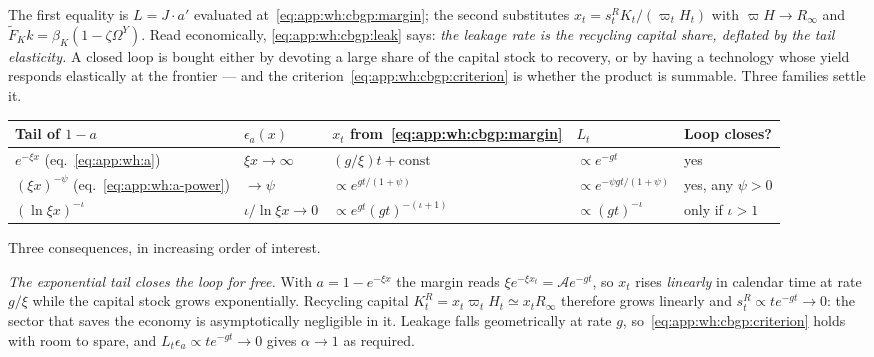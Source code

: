 The first equality is $L=J\cdot a'$ evaluated at~\eqref{eq:app:wh:cbgp:margin}; the second substitutes $x_t=s^R_tK_t/\left(\varpi_tH_t\right)$ with $\varpi H\to R_\infty$ and $\tilde F_Kk=\beta_K\left(1-\zeta\Omega^Y\right)$. Read economically, \eqref{eq:app:wh:cbgp:leak} says: \emph{the leakage rate is the recycling capital share, deflated by the tail elasticity.} A closed loop is bought either by devoting a large share of the capital stock to recovery, or by having a technology whose yield responds elastically at the frontier --- and the criterion~\eqref{eq:app:wh:cbgp:criterion} is whether the product is summable. Three families settle it.

\begin{center}
\begin{tabular}{lllll}
\toprule
Tail of $1-a$ & $\epsilon_a\left(x\right)$ & $x_t$ from~\eqref{eq:app:wh:cbgp:margin} & $L_t$ & Loop closes? \\
\midrule
$e^{-\xi x}$ (eq.~\ref{eq:app:wh:a}) & $\xi x\to\infty$ & $\left(g/\xi\right)t+\mathrm{const}$ & $\propto e^{-gt}$ & yes \\
$\left(\xi x\right)^{-\psi}$ (eq.~\ref{eq:app:wh:a-power}) & $\to\psi$ & $\propto e^{gt/\left(1+\psi\right)}$ & $\propto e^{-\psi gt/\left(1+\psi\right)}$ & yes, any $\psi>0$ \\
$\left(\ln\xi x\right)^{-\iota}$ & $\iota/\ln\xi x\to0$ & $\propto e^{gt}\left(gt\right)^{-\left(\iota+1\right)}$ & $\propto\left(gt\right)^{-\iota}$ & only if $\iota>1$ \\
\bottomrule
\end{tabular}
\end{center}

Three consequences, in increasing order of interest.

\emph{The exponential tail closes the loop for free.} With $a=1-e^{-\xi x}$ the margin reads $\xi e^{-\xi x_t}=\mathcal Ae^{-gt}$, so $x_t$ rises \emph{linearly} in calendar time at rate $g/\xi$ while the capital stock grows exponentially. Recycling capital $K^R_t=x_t\varpi_tH_t\simeq x_tR_\infty$ therefore grows linearly and $s^R_t\propto te^{-gt}\to0$: the sector that saves the economy is asymptotically negligible in it. Leakage falls geometrically at rate $g$, so~\eqref{eq:app:wh:cbgp:criterion} holds with room to spare, and $L_t\epsilon_a\propto te^{-gt}\to0$ gives $\alpha\to1$ as required.


